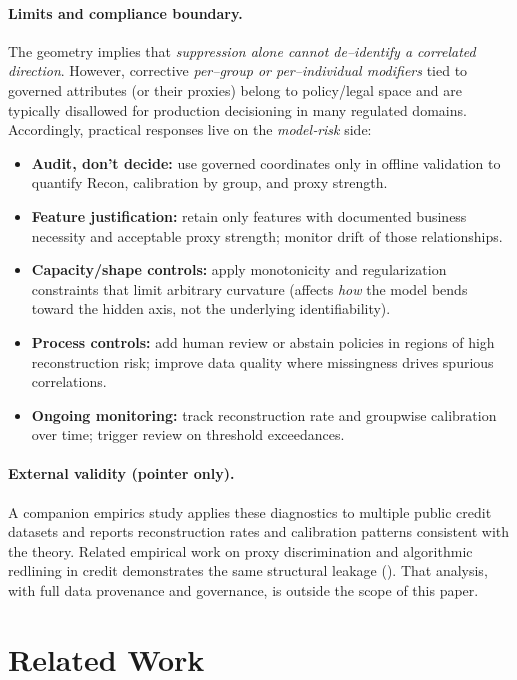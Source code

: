 \documentclass[11pt]{article}
\begin{document}
\paragraph{Limits and compliance boundary.}
The geometry implies that \emph{suppression alone cannot de–identify a correlated direction}.  
However, corrective \emph{per–group or per–individual modifiers} tied to governed attributes (or their proxies) belong to policy/legal space and are typically disallowed for production decisioning in many regulated domains.  
Accordingly, practical responses live on the \emph{model‐risk} side:
\begin{itemize}[leftmargin=1.2em]
  \item \textbf{Audit, don’t decide:} use governed coordinates only in offline validation to quantify $\mathrm{Recon}$, calibration by group, and proxy strength.
  \item \textbf{Feature justification:} retain only features with documented business necessity and acceptable proxy strength; monitor drift of those relationships.
  \item \textbf{Capacity/shape controls:} apply monotonicity and regularization constraints that limit arbitrary curvature (affects \emph{how} the model bends toward the hidden axis, not the underlying identifiability).
  \item \textbf{Process controls:} add human review or abstain policies in regions of high reconstruction risk; improve data quality where missingness drives spurious correlations.
  \item \textbf{Ongoing monitoring:} track reconstruction rate and groupwise calibration over time; trigger review on threshold exceedances.
\end{itemize}

\paragraph{External validity (pointer only).}
A companion empirics study applies these diagnostics to multiple public credit datasets and reports reconstruction rates and calibration patterns consistent with the theory. Related empirical work on proxy discrimination and algorithmic redlining in credit 
demonstrates the same structural leakage (\citealp{fuster2020predictably,wachter2021bias}). That analysis, with full data provenance and governance, is outside the scope of this paper.

\section{Related Work}
\label{sec:related}
\end{document}
